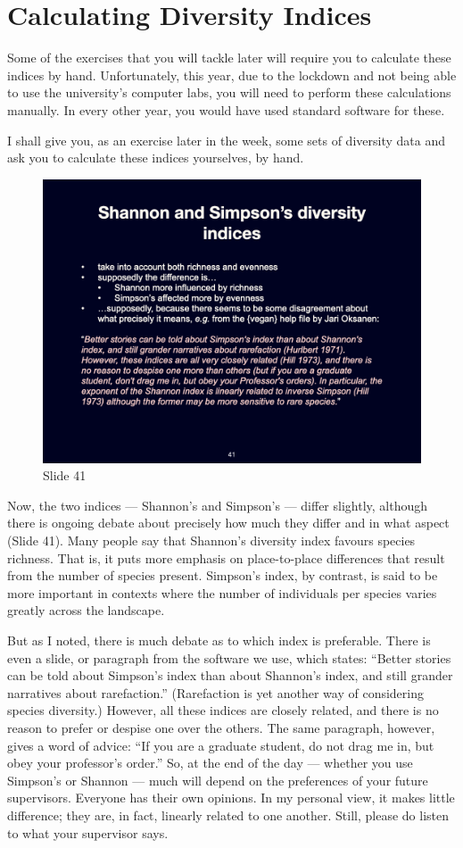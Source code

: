 \documentclass[
  11pt,
]{book}
\begin{document}
\section{Calculating Diversity
Indices}\label{calculating-diversity-indices}

Some of the exercises that you will tackle later will require you to
calculate these indices by hand. Unfortunately, this year, due to the
lockdown and not being able to use the university's computer labs, you
will need to perform these calculations manually. In every other year,
you would have used standard software for these.

I shall give you, as an exercise later in the week, some sets of
diversity data and ask you to calculate these indices yourselves, by
hand.

\begin{figure}[ht]
\centering
\includegraphics[width=0.8\linewidth]{../images/BDC334/BDC334-041.jpeg}
\caption*{Slide 41}
\end{figure}

Now, the two indices --- Shannon's and Simpson's --- differ slightly,
although there is ongoing debate about precisely how much they differ
and in what aspect (Slide 41). Many people say that Shannon's diversity
index favours species richness. That is, it puts more emphasis on
place-to-place differences that result from the number of species
present. Simpson's index, by contrast, is said to be more important in
contexts where the number of individuals per species varies greatly
across the landscape.

But as I noted, there is much debate as to which index is preferable.
There is even a slide, or paragraph from the software we use, which
states: ``Better stories can be told about Simpson's index than about
Shannon's index, and still grander narratives about rarefaction.''
(Rarefaction is yet another way of considering species diversity.)
However, all these indices are closely related, and there is no reason
to prefer or despise one over the others. The same paragraph, however,
gives a word of advice: ``If you are a graduate student, do not drag me
in, but obey your professor's order.'' So, at the end of the day ---
whether you use Simpson's or Shannon --- much will depend on the
preferences of your future supervisors. Everyone has their own opinions.
In my personal view, it makes little difference; they are, in fact,
linearly related to one another. Still, please do listen to what your
supervisor says.
\end{document}
